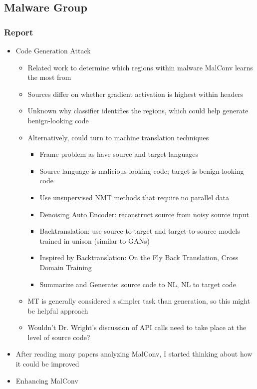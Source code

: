 \documentclass{article}
\begin{document}
\subsection*{Malware Group}
\subsubsection*{Report}
\begin{itemize}
	\item Code Generation Attack
	\begin{itemize}
		\item Related work to determine which regions within malware MalConv learns the most from
		\item Sources differ on whether gradient activation is highest within headers
		\item Unknown why classifier identifies the regions, which could help generate benign-looking code
		\item Alternatively, could turn to machine translation techniques
		\begin{itemize}
			\item Frame problem as have source and target languages
			\item Source language is malicious-looking code; target is benign-looking code
			\item Use unsupervised NMT methods that require no parallel data
			\item Denoising Auto Encoder: reconstruct source from noisy source input
			\item Backtranslation: use source-to-target and target-to-source models trained in unison (similar to GANs)
			\item Inspired by Backtranslation: On the Fly Back Translation, Cross Domain Training
			\item Summarize and Generate: source code to NL, NL to target code
		\end{itemize}
		\item MT is generally considered a simpler task than generation, so this might be helpful approach
		\item Wouldn't Dr. Wright's discussion of API calls need to take place at the level of source code?
	\end{itemize}
	\item After reading many papers analyzing MalConv, I started thinking about how it could be improved
	\item Enhancing MalConv
	\begin{itemize}

\end{itemize}
\end{itemize}
\end{document}
